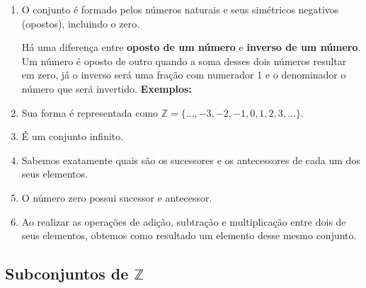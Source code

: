 \documentclass[10pt]{article}
\begin{document}
    \begin{enumerate}[label=\textbf{(\Roman*)}]
        \item O conjunto é formado pelos números naturais e seus simétricos negativos (opostos), incluindo o zero.
            \begin{obs}
                Há uma diferença entre \textbf{oposto de um número} e \textbf{inverso de um número}. Um número é oposto de outro quando a soma desses dois números resultar em zero, já o inverso será uma fração com numerador 1 e o denominador o número que será invertido.
                \textbf{Exemplos:}
                \begin{enumerate}
                \end{enumerate}
            \end{obs}
\newpage

        \item Sua forma é representada como \( \mathbb{Z} = \{\ldots, -3, -2, -1, 0, 1, 2, 3, \ldots\}\).
        \item É um conjunto infinito.
        \item Sabemos exatamente quais são os sucessores e os antecessores de cada um dos seus elementos.
        \item O número zero possui sucessor e antecessor.
        \item Ao realizar as operações de adição, subtração e multiplicação entre dois de seus elementos, obtemos como resultado um elemento desse mesmo conjunto.
    \end{enumerate}
\subsection*{Subconjuntos de \( \mathbb{Z} \)}
\end{document}
